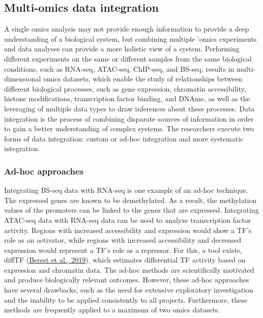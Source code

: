 \documentclass[12pt,twoside]{reedthesis}
\begin{document}
\hypertarget{multi-omics-data-integration}{%
\subsection*{Multi-omics data integration}\label{multi-omics-data-integration}}

A single omics analysis may not provide enough information to provide a
deep understanding of a biological system, but combining multiple 'omics
experiments and data analyses can provide a more holistic view of a
system. Performing different experiments on the same or different
samples from the same biological conditions, such as RNA-seq, ATAC-seq,
ChIP-seq, and BS-seq, results in multi-dimensional omics datasets, which
enable the study of relationships between different biological
processes, such as gene expression, chromatin accessibility, histone
modifications, transcription factor binding, and DNAme, as well as the
leveraging of multiple data types to draw inferences about these
processes. Data integration is the process of combining disparate
sources of information in order to gain a better understanding of
complex systems. The researchers execute two forms of data integration:
custom or ad-hoc integration and more systematic integration.

\hypertarget{ad-hoc-approaches}{%
\subsubsection{Ad-hoc approaches}\label{ad-hoc-approaches}}

Integrating BS-seq data with RNA-seq is one example of an ad-hoc
technique. The expressed genes are known to be demethylated. As a
result, the methylation values of the promoters can be linked to the
genes that are expressed. Integrating ATAC-seq data with RNA-seq data
can be used to analyze transcription factor activity. Regions with
increased accessibility and expression would show a TF's role as an
activator, while regions with increased accessibility and decreased
expression would represent a TF's role as a repressor. For this, a tool
exists, diffTF (\protect\hyperlink{ref-berest2019}{Berest et al., 2019}), which estimates differential TF activity
based on expression and chromatin data. The ad-hoc methods are
scientifically motivated and produce biologically relevant outcomes.
However, these ad-hoc approaches have several drawbacks, such as the
need for extensive exploratory investigation and the inability to be
applied consistently to all projects. Furthermore, these methods are
frequently applied to a maximum of two omics datasets.
\end{document}
